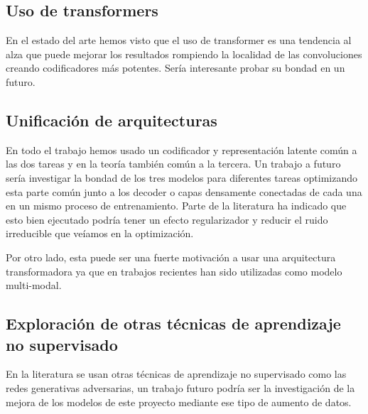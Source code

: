 \subsection{Uso de transformers}

En el estado del arte hemos visto que el uso de transformer es una tendencia al alza que puede mejorar los resultados rompiendo la localidad de las convoluciones creando codificadores más potentes. Sería interesante probar su bondad en un futuro.  

\subsection{Unificación de arquitecturas}

En todo el trabajo hemos usado un codificador y representación latente común a las dos tareas y en la teoría también común a la tercera. Un trabajo a futuro sería investigar la bondad de los tres modelos para diferentes tareas optimizando esta parte común junto a los decoder o capas densamente conectadas de cada una en un mismo proceso de entrenamiento. Parte de la literatura ha indicado que esto bien ejecutado podría tener un efecto regularizador y reducir el ruido irreducible que veíamos en la optimización.

Por otro lado, esta puede ser una fuerte motivación a usar una arquitectura transformadora ya que en trabajos recientes han sido utilizadas como modelo multi-modal.

\subsection{Exploración de otras técnicas de aprendizaje no supervisado}

En la literatura se usan otras técnicas de aprendizaje no supervisado como las redes generativas adversarias, un trabajo futuro podría ser la investigación de la mejora de los modelos de este proyecto mediante ese tipo de aumento de datos.
